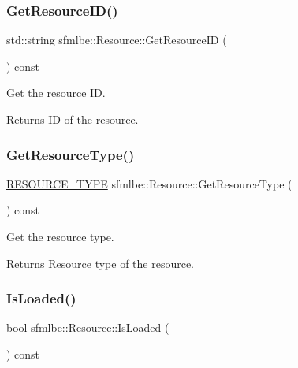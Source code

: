 \subsubsection{\texorpdfstring{Get\+Resource\+I\+D()}{GetResourceID()}}
{\footnotesize\ttfamily std\+::string sfmlbe\+::\+Resource\+::\+Get\+Resource\+ID (\begin{DoxyParamCaption}{ }\end{DoxyParamCaption}) const\hspace{0.3cm}{\ttfamily [inline]}}



Get the resource ID. 

\begin{DoxyReturn}{Returns}
ID of the resource. 
\end{DoxyReturn}
\mbox{\label{classsfmlbe_1_1_resource_a8e0ab17344e90a3c1175a8aa87a96c35}} 
\subsubsection{\texorpdfstring{Get\+Resource\+Type()}{GetResourceType()}}
{\footnotesize\ttfamily \mbox{\hyperlink{namespacesfmlbe_ac4335ed3060bba025f73e01f9dccb2dd}{R\+E\+S\+O\+U\+R\+C\+E\+\_\+\+T\+Y\+PE}} sfmlbe\+::\+Resource\+::\+Get\+Resource\+Type (\begin{DoxyParamCaption}{ }\end{DoxyParamCaption}) const\hspace{0.3cm}{\ttfamily [inline]}}



Get the resource type. 

\begin{DoxyReturn}{Returns}
\mbox{\hyperlink{classsfmlbe_1_1_resource}{Resource}} type of the resource. 
\end{DoxyReturn}
\mbox{\label{classsfmlbe_1_1_resource_acd0812c81f7d5d851a4671f0cf7bb4f1}} 
\subsubsection{\texorpdfstring{Is\+Loaded()}{IsLoaded()}}
{\footnotesize\ttfamily bool sfmlbe\+::\+Resource\+::\+Is\+Loaded (\begin{DoxyParamCaption}{ }\end{DoxyParamCaption}) const\hspace{0.3cm}{\ttfamily [inline]}}



